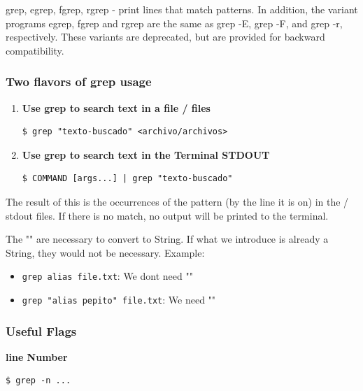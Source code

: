 \documentclass{article}
\newenvironment{blocktemplate}[1]{%
    \tcolorbox[beamer,%
    noparskip,breakable,
    colframe=Blue,%
    colbacklower=LimeGreen!75!LightGreen,%
    title=#1]}%
    {\endtcolorbox}
\newenvironment{blocktemplateII}[1]{%
    \tcolorbox[beamer,%
    noparskip,breakable,
    colframe=Green,%
    colbacklower=LimeGreen!75!LightGreen,%
    title=#1]}%
    {\endtcolorbox}
\newenvironment{codetemplate}[1][]{%
  \mybasecolorbox[#1]
  \itshape
}{%
  \endmybasecolorbox
}
\begin{document}
\begin{blocktemplate}{Nota}
grep, egrep, fgrep, rgrep - print lines that match patterns.
In addition, the variant programs egrep, fgrep and rgrep are the same as grep -E, grep -F, and grep -r, respectively.  These variants are deprecated, but are provided for backward compatibility.
\end{blocktemplate}

\subsubsection{Two flavors of grep usage}
\begin{enumerate}
    \item \textbf{Use grep to search text in a file / files}
\begin{codetemplate}{}
\begin{verbatim}
$ grep "texto-buscado" <archivo/archivos>
\end{verbatim}
\end{codetemplate}

    \item \textbf{Use grep to search text in the Terminal STDOUT}
\begin{codetemplate}{}
\begin{verbatim}
$ COMMAND [args...] | grep "texto-buscado"
\end{verbatim}
\end{codetemplate}
\end{enumerate}
The result of this is the occurrences of the pattern (by the line it is on) in the / stdout files. If there is no match, no output will be printed to the terminal.

\begin{blocktemplateII}{Note}
    The "" are necessary to convert to String. If what we introduce is already a String, they would not be necessary. Example:
\begin{itemize}
    \item \verb|grep alias file.txt|: We dont need ""
    \item \verb|grep "alias pepito" file.txt|: We need ""
\end{itemize}
\end{blocktemplateII}

\subsubsection{Useful Flags}

\textbf{line Number}
\begin{codetemplate}{}
\begin{verbatim}
$ grep -n ...
\end{verbatim}
\end{codetemplate}
\end{document}
